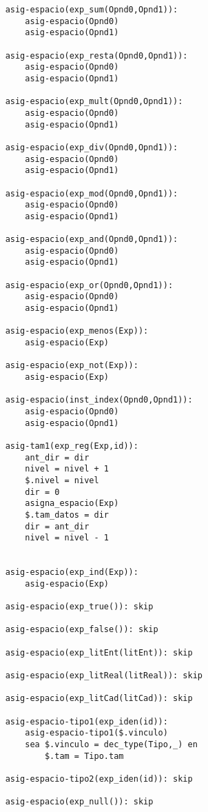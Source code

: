 \begin{lstlisting}
    asig-espacio(exp_sum(Opnd0,Opnd1)):
        asig-espacio(Opnd0)
        asig-espacio(Opnd1)

    asig-espacio(exp_resta(Opnd0,Opnd1)):
        asig-espacio(Opnd0)
        asig-espacio(Opnd1)

    asig-espacio(exp_mult(Opnd0,Opnd1)):
        asig-espacio(Opnd0)
        asig-espacio(Opnd1)

    asig-espacio(exp_div(Opnd0,Opnd1)):
        asig-espacio(Opnd0)
        asig-espacio(Opnd1)

    asig-espacio(exp_mod(Opnd0,Opnd1)):
        asig-espacio(Opnd0)
        asig-espacio(Opnd1)

    asig-espacio(exp_and(Opnd0,Opnd1)):
        asig-espacio(Opnd0)
        asig-espacio(Opnd1)

    asig-espacio(exp_or(Opnd0,Opnd1)):
        asig-espacio(Opnd0)
        asig-espacio(Opnd1)

    asig-espacio(exp_menos(Exp)):
        asig-espacio(Exp)

    asig-espacio(exp_not(Exp)):
        asig-espacio(Exp)

    asig-espacio(inst_index(Opnd0,Opnd1)):
        asig-espacio(Opnd0)
        asig-espacio(Opnd1)

    asig-tam1(exp_reg(Exp,id)):
        ant_dir = dir 
        nivel = nivel + 1
        $.nivel = nivel
        dir = 0 
        asigna_espacio(Exp)
        $.tam_datos = dir 
        dir = ant_dir 
        nivel = nivel - 1 
       

    asig-espacio(exp_ind(Exp)):
        asig-espacio(Exp)

    asig-espacio(exp_true()): skip

    asig-espacio(exp_false()): skip

    asig-espacio(exp_litEnt(litEnt)): skip

    asig-espacio(exp_litReal(litReal)): skip

    asig-espacio(exp_litCad(litCad)): skip

    asig-espacio-tipo1(exp_iden(id)):
        asig-espacio-tipo1($.vinculo)
        sea $.vinculo = dec_type(Tipo,_) en
            $.tam = Tipo.tam
            
    asig-espacio-tipo2(exp_iden(id)): skip

    asig-espacio(exp_null()): skip


\end{lstlisting}